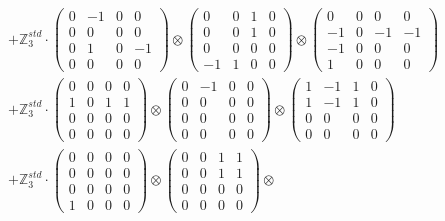 \documentclass{article}
\begin{document}
{\begin{align}
        &+ \label{Rs16-Rc11-Solution-6-c22} \mathbb{Z}_3^{std} \cdot 
            \begin{pmatrix} 0 & -1 & 0 & 0 \\ 0 & 0 & 0 & 0 \\ 0 & 1 & 0 & -1 \\ 0 & 0 & 0 & 0 \end{pmatrix} \otimes 
            \begin{pmatrix} 0 & 0 & 1 & 0 \\ 0 & 0 & 1 & 0 \\ 0 & 0 & 0 & 0 \\ -1 & 1 & 0 & 0 \end{pmatrix} \otimes 
            \begin{pmatrix} 0 & 0 & 0 & 0 \\ -1 & 0 & -1 & -1 \\ -1 & 0 & 0 & 0 \\ 1 & 0 & 0 & 0 \end{pmatrix} \\ 
        &+ \label{Rs16-Rc11-Solution-6-c23} \mathbb{Z}_3^{std} \cdot 
            \begin{pmatrix} 0 & 0 & 0 & 0 \\ 1 & 0 & 1 & 1 \\ 0 & 0 & 0 & 0 \\ 0 & 0 & 0 & 0 \end{pmatrix} \otimes 
            \begin{pmatrix} 0 & -1 & 0 & 0 \\ 0 & 0 & 0 & 0 \\ 0 & 0 & 0 & 0 \\ 0 & 0 & 0 & 0 \end{pmatrix} \otimes 
            \begin{pmatrix} 1 & -1 & 1 & 0 \\ 1 & -1 & 1 & 0 \\ 0 & 0 & 0 & 0 \\ 0 & 0 & 0 & 0 \end{pmatrix} \\ 
        &+ \label{Rs16-Rc11-Solution-6-c24} \mathbb{Z}_3^{std} \cdot 
            \begin{pmatrix} 0 & 0 & 0 & 0 \\ 0 & 0 & 0 & 0 \\ 0 & 0 & 0 & 0 \\ 1 & 0 & 0 & 0 \end{pmatrix} \otimes 
            \begin{pmatrix} 0 & 0 & 1 & 1 \\ 0 & 0 & 1 & 1 \\ 0 & 0 & 0 & 0 \\ 0 & 0 & 0 & 0 \end{pmatrix} \otimes 

\end{align}}
\end{document}
